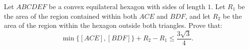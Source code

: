 Let $ABCDEF$ be a convex equilateral hexagon with sides of length $1$. Let $R_1$ be the area of the region contained within both $ACE$ and $BDF$, and let $R_2$ be the area of the region within the hexagon outside both triangles. Prove that: \[ \min \{ [ACE], [BDF] \} + R_2 - R_1 \le \frac{3\sqrt{3}}{4}. \]